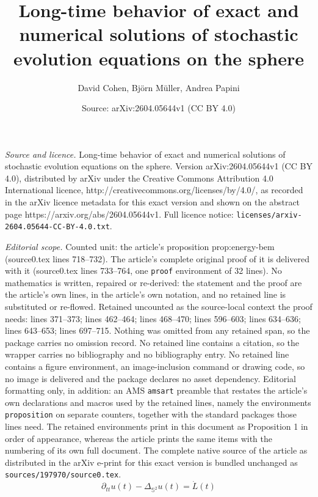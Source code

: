 \documentclass[10pt,a4paper]{amsart}
\title{Long-time behavior of exact and numerical solutions of stochastic evolution equations on the sphere}
\author{David Cohen, Bj\"orn M\"uller, Andrea Papini}
\date{Source: arXiv:2604.05644v1 (CC BY 4.0)}
\newcommand{\Deltalb}{\Delta_{\IS^2}}
\newcommand{\IS}{\mathbb{S}}
\begin{document}
\maketitle

\noindent\emph{Source and licence.} Long-time behavior of exact and numerical solutions of stochastic evolution equations on the sphere. Version arXiv:2604.05644v1 (CC BY 4.0), distributed by arXiv under the Creative Commons Attribution 4.0 International licence, http://creativecommons.org/licenses/by/4.0/, as recorded in the arXiv licence metadata for this exact version and shown on the abstract page https://arxiv.org/abs/2604.05644v1. Full licence notice: \texttt{licenses/arxiv-2604.05644-CC-BY-4.0.txt}.\par\smallskip

\noindent\textit{Editorial scope.} Counted unit: the article's proposition prop:energy-bem (source0.tex lines 718--732). The article's complete original proof of it is delivered with it (source0.tex lines 733--764, one \texttt{proof} environment of 32 lines). No mathematics is written, repaired or re-derived: the statement and the proof are the article's own lines, in the article's own notation, and no retained line is substituted or re-flowed.  Retained uncounted as the source-local context the proof needs: lines 371--373; lines 462--464; lines 468--470; lines 596--603; lines 634--636; lines 643--653; lines 697--715.  Nothing was omitted from any retained span, so the package carries no omission record.  No retained line contains a citation, so the wrapper carries no bibliography and no bibliography entry.  No retained line contains a figure environment, an image-inclusion command or drawing code, so no image is delivered and the package declares no asset dependency.  Editorial formatting only, in addition: an AMS \texttt{amsart} preamble that restates the article's own declarations and macros used by the retained lines, namely the environments \texttt{proposition} on separate counters, together with the standard packages those lines need.  The retained environments print in this document as Proposition 1 in order of appearance, whereas the article prints the same items with the numbering of its own full document.  The complete native source of the article as distributed in the arXiv e-print for this exact version is bundled unchanged as \texttt{sources/197970/source0.tex}.
\begin{equation}\label{swe}
\partial_{tt}u(t)-\Deltalb u(t)=\dot{L}(t)
\end{equation}
\end{document}
